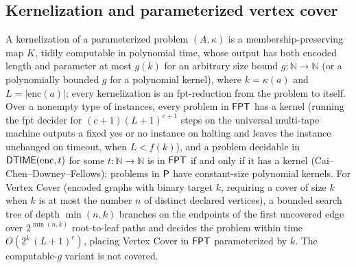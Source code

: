 \begin{result}
\subsection{Kernelization and parameterized vertex cover}
A kernelization of a parameterized problem $(A,\kappa)$ is a membership-preserving map $K$, tidily
computable in polynomial time, whose output has both encoded length and parameter at most $g(k)$
for an arbitrary size bound $g\colon\mathbb{N}\to\mathbb{N}$ (or a polynomially bounded $g$ for a
polynomial kernel), where $k=\kappa(a)$ and $L=|\mathrm{enc}(a)|$; every kernelization is an
fpt-reduction from the problem to itself. Over a nonempty type of instances, every problem in
$\mathsf{FPT}$ has a kernel (running the fpt decider for $(c+1)(L+1)^{e+1}$ steps on the universal
multi-tape machine outputs a fixed yes or no instance on halting and leaves the instance unchanged
on timeout, when $L<f(k)$), and a problem decidable in $\mathsf{DTIME}(\mathrm{enc},t)$ for some
$t\colon\mathbb{N}\to\mathbb{N}$ is in $\mathsf{FPT}$ if and only if it has a kernel
(Cai--Chen--Downey--Fellows); problems in $\mathsf{P}$ have constant-size polynomial kernels. For
Vertex Cover (encoded graphs with binary target $k$, requiring a cover of size $k$ when $k$ is at
most the number $n$ of distinct declared vertices), a bounded search tree of depth $\min(n,k)$
branches on the endpoints of the first uncovered edge over $2^{\min(n,k)}$ root-to-leaf paths and
decides the problem within time $O(2^k\,(L+1)^e)$, placing Vertex Cover in $\mathsf{FPT}$
parameterized by $k$. The computable-$g$ variant is not covered.
\citep{CaiChenDowneyFellows1997,DowneyFellows1999,FlumGrohe2006,CyganEtAl2015}

\end{result}
